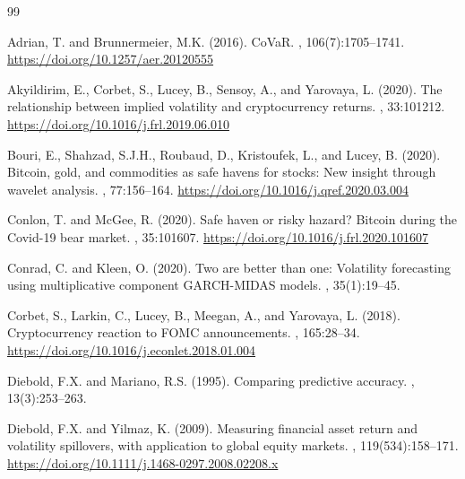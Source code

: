 \documentclass[11pt,a4paper]{article}
\begin{document}
\begin{thebibliography}{99}

Adrian, T. and Brunnermeier, M.K. (2016).
\newblock CoVaR.
, 106(7):1705--1741.
\newblock \url{https://doi.org/10.1257/aer.20120555}

Akyildirim, E., Corbet, S., Lucey, B., Sensoy, A., and Yarovaya, L. (2020).
\newblock The relationship between implied volatility and cryptocurrency returns.
, 33:101212.
\newblock \url{https://doi.org/10.1016/j.frl.2019.06.010}

Bouri, E., Shahzad, S.J.H., Roubaud, D., Kristoufek, L., and Lucey, B. (2020).
\newblock Bitcoin, gold, and commodities as safe havens for stocks: New insight through wavelet analysis.
, 77:156--164.
\newblock \url{https://doi.org/10.1016/j.qref.2020.03.004}

Conlon, T. and McGee, R. (2020).
\newblock Safe haven or risky hazard? Bitcoin during the Covid-19 bear market.
, 35:101607.
\newblock \url{https://doi.org/10.1016/j.frl.2020.101607}

Conrad, C. and Kleen, O. (2020).
\newblock Two are better than one: Volatility forecasting using multiplicative component GARCH-MIDAS models.
, 35(1):19--45.

Corbet, S., Larkin, C., Lucey, B., Meegan, A., and Yarovaya, L. (2018).
\newblock Cryptocurrency reaction to FOMC announcements.
, 165:28--34.
\newblock \url{https://doi.org/10.1016/j.econlet.2018.01.004}

Diebold, F.X. and Mariano, R.S. (1995).
\newblock Comparing predictive accuracy.
, 13(3):253--263.

Diebold, F.X. and Yilmaz, K. (2009).
\newblock Measuring financial asset return and volatility spillovers, with application to global equity markets.
, 119(534):158--171.
\newblock \url{https://doi.org/10.1111/j.1468-0297.2008.02208.x}


\end{thebibliography}
\end{document}
